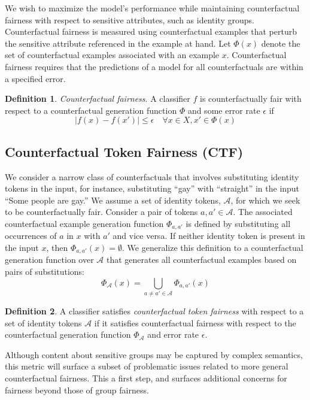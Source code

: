 \documentclass[letterpaper]{article} %
\theoremstyle{definition}
\newtheorem{definition}{Definition}
\begin{document}
We wish to maximize the model's performance while maintaining counterfactual fairness with respect to sensitive attributes, such as identity groups. Counterfactual fairness is measured using counterfactual examples that perturb the sensitive attribute referenced in the example at hand.
Let $\Phi(x)$ denote the set of counterfactual examples associated with an example $x$. Counterfactual fairness requires that the predictions of a model for all counterfactuals are within a specified error. 

\begin{definition} \textit{Counterfactual fairness}. A classifier $f$ is counterfactually fair with respect to a counterfactual generation function $\Phi$ and some error rate $\epsilon$ if
$$|f(x) - f(x')| \leq \epsilon \quad \forall x \in X, x' \in \Phi(x)$$
\end{definition}

\subsection{Counterfactual Token Fairness (CTF)} \label{ctf}
We consider a narrow class of counterfactuals that involves substituting identity tokens in the input, for instance, substituting ``gay'' with ``straight'' in the input ``Some people are gay.'' 
We assume a set of identity tokens, $\mathcal{A}$, for which we seek to be counterfactually fair. Consider a pair of tokens $a, a' \in \mathcal{A}$. The associated counterfactual example generation function $\Phi_{a, a'}$ is defined by substituting all occurrences of $a$ in $x$ with $a'$ and vice versa. If neither identity token is present in the input $x$, then $\Phi_{a, a'}(x) = \emptyset$. 
We generalize this definition to a counterfactual generation function over $\mathcal{A}$ that generates all counterfactual examples based on pairs of substitutions:
$$\Phi_{\mathcal{A}}(x) = \bigcup_{a \neq a' \in \mathcal{A}} \Phi_{a, a'}(x)$$

\begin{definition}
A classifier satisfies \emph{counterfactual token fairness} with respect to a set of identity tokens $\mathcal{A}$ if it satisfies counterfactual fairness with respect to the counterfactual generation function $\Phi_{\mathcal{A}}$ and error rate $\epsilon$.
\end{definition}

Although content about sensitive groups may be captured by complex semantics, this metric will surface a subset of problematic issues related to more general counterfactual fairness. This a first step, and surfaces additional concerns for fairness beyond those of group fairness.
\end{document}
